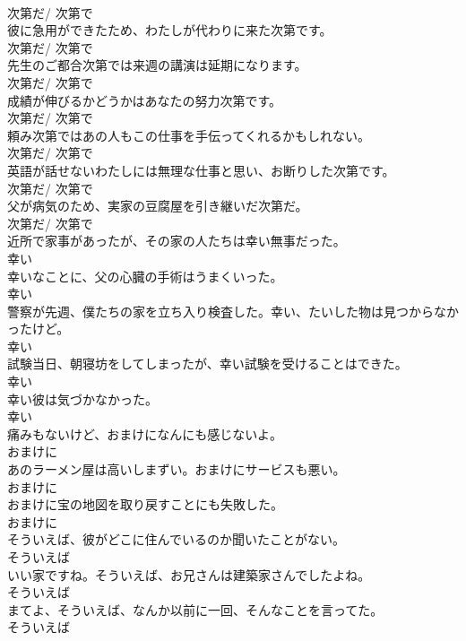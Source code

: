 \documentclass[8pt]{extreport}
\begin{document}
\begin{CJK}{UTF8}{min}
\\	次第だ/ 次第で
\\	彼に急用ができたため、わたしが代わりに来た次第です。	
\\	次第だ/ 次第で
\\	先生のご都合次第では来週の講演は延期になります。	
\\	次第だ/ 次第で
\\	成績が伸びるかどうかはあなたの努力次第です。	
\\	次第だ/ 次第で
\\	頼み次第ではあの人もこの仕事を手伝ってくれるかもしれない。	
\\	次第だ/ 次第で
\\	英語が話せないわたしには無理な仕事と思い、お断りした次第です。	
\\	次第だ/ 次第で
\\	父が病気のため、実家の豆腐屋を引き継いだ次第だ。	
\\	次第だ/ 次第で
\\	近所で家事があったが、その家の人たちは幸い無事だった。	
\\	幸い
\\	幸いなことに、父の心臓の手術はうまくいった。	
\\	幸い
\\	警察が先週、僕たちの家を立ち入り検査した。幸い、たいした物は見つからなかったけど。	
\\	幸い
\\	試験当日、朝寝坊をしてしまったが、幸い試験を受けることはできた。	
\\	幸い
\\	幸い彼は気づかなかった。	
\\	幸い
\\	痛みもないけど、おまけになんにも感じないよ。	
\\	おまけに
\\	あのラーメン屋は高いしまずい。おまけにサービスも悪い。	
\\	おまけに
\\	おまけに宝の地図を取り戻すことにも失敗した。	
\\	おまけに
\\	そういえば、彼がどこに住んでいるのか聞いたことがない。	
\\	そういえば
\\	いい家ですね。そういえば、お兄さんは建築家さんでしたよね。	
\\	そういえば
\\	まてよ、そういえば、なんか以前に一回、そんなことを言ってた。	
\\	そういえば

\end{CJK}
\end{document}
